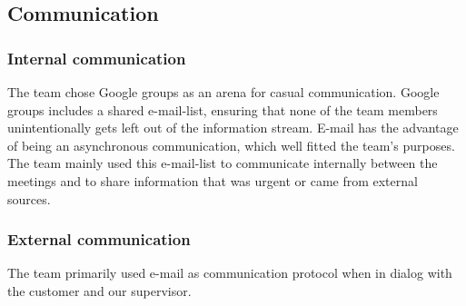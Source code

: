\subsection{Communication}
\subsubsection{Internal communication}
The team chose Google groups as an arena for casual communication. Google groups includes a shared e-mail-list, ensuring that none of the team members unintentionally gets left out of the information stream. E-mail has the advantage of being an asynchronous communication, which well fitted the team's purposes. The team mainly used this e-mail-list to communicate internally between the meetings and to share information that was urgent or came from external sources. 

\subsubsection{External communication}
The team primarily used e-mail as communication protocol when in dialog with the customer and our supervisor.